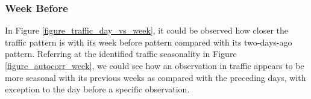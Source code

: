 \begin{table}[h] 
\centering
    \centering
      \captionsetup{justification=centering}
    \hfill
    \caption{Transition distribution of traffic condition of (a) Pablo Ocampo and (b) Antipolo for all working days}

    \label{table_workingday_transition}
\end{table}



\subsubsection{Week Before}
In Figure \ref{figure_traffic_day_vs_week}, it could be observed how closer the traffic pattern is with its week before pattern compared with its two-days-ago pattern. Referring at the identified traffic seasonality in Figure \ref{figure_autocorr_week}, we could see how an observation in traffic appears to be more seasonal with its previous weeks as compared with the preceding days, with exception to the day before a specific observation.

